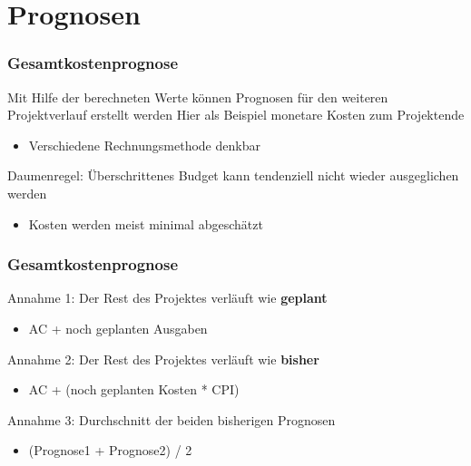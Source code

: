 \documentclass{f4_beamer}
\begin{document}
\section{Prognosen}
\begin{frame}[fragile]
    \frametitle{Gesamtkostenprognose}
    \Large
    Mit Hilfe der berechneten Werte können Prognosen für den weiteren Projektverlauf erstellt werden
    Hier als Beispiel monetare Kosten zum Projektende
    \begin{itemize}
        \item Verschiedene Rechnungsmethode denkbar
    \end{itemize}
    Daumenregel: Überschrittenes Budget kann tendenziell nicht wieder ausgeglichen werden
    \begin{itemize}
        \item Kosten werden meist minimal abgeschätzt
    \end{itemize}
\end{frame}
\begin{frame}[fragile]
    \frametitle{Gesamtkostenprognose}
    \Large
    Annahme 1: Der Rest des Projektes verläuft wie \textbf{geplant}
    \begin{itemize}
        \item AC + noch geplanten Ausgaben
    \end{itemize}
    \bigbreak
    Annahme 2: Der Rest des Projektes verläuft wie \textbf{bisher}
    \begin{itemize}
        \item AC + (noch geplanten Kosten * CPI)
    \end{itemize}
    \bigbreak
    Annahme 3: Durchschnitt der beiden bisherigen Prognosen
    \begin{itemize}
        \item (Prognose1 + Prognose2) / 2
    \end{itemize}
\end{frame}
\end{document}

